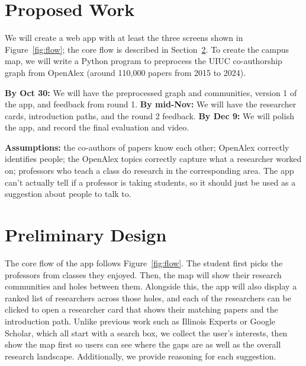 \documentclass[sigconf,nonacm]{acmart}
\begin{document}

\section{Proposed Work}
We will create a web app with at least the three screens shown in Figure~\ref{fig:flow}; the core flow is described in Section~\ref{sec:design}. To create the campus map, we will write a Python program to preprocess the UIUC co-authorship graph from OpenAlex (around 110,000 papers from 2015 to 2024).

\noindent\textbf{By Oct 30:} We will have the preprocessed graph and communities, version 1 of the app, and feedback from round 1.
\textbf{By mid-Nov:} We will have the researcher cards, introduction paths, and the round 2 feedback.
\textbf{By Dec 9:} We will polish the app, and record the final evaluation and video.

\noindent\textbf{Assumptions:} the co-authors of papers know each other; OpenAlex correctly identifies people; the OpenAlex topics correctly capture what a researcher worked on; professors who teach a class do research in the corresponding area. The app can't actually tell if a professor is taking students, so it should just be used as a suggestion about people to talk to.

\section{Preliminary Design}\label{sec:design}
The core flow of the app follows Figure~\ref{fig:flow}. The student first picks the professors from classes they enjoyed. Then, the map will show their research communities and holes between them. Alongside this, the app will also display a ranked list of researchers across those holes, and each of the researchers can be clicked to open a researcher card that shows their matching papers and the introduction path. Unlike previous work such as Illinois Experts or Google Scholar, which all start with a search box, we collect the user's interests, then show the map first so users can see where the gaps are as well as the overall research landscape. Additionally, we provide reasoning for each suggestion.
\end{document}
